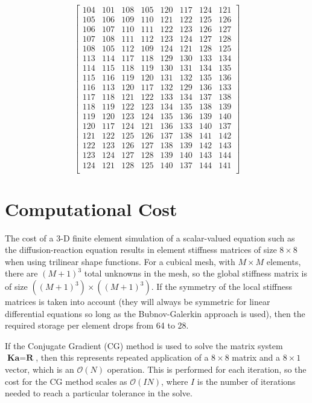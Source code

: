 \documentclass[10pt]{article}
\begin{document}
\begin{equation}
\begin{bmatrix}
104 & 101 & 108 & 105 & 120 & 117 & 124 & 121\\
105 & 106 & 109 & 110 & 121 & 122 & 125 & 126\\
106 & 107 & 110 & 111 & 122 & 123 & 126 & 127\\
107 & 108 & 111 & 112 & 123 & 124 & 127 & 128\\
108 & 105 & 112 & 109 & 124 & 121 & 128 & 125\\
113 & 114 & 117 & 118 & 129 & 130 & 133 & 134\\
114 & 115 & 118 & 119 & 130 & 131 & 134 & 135\\
115 & 116 & 119 & 120 & 131 & 132 & 135 & 136\\
116 & 113 & 120 & 117 & 132 & 129 & 136 & 133\\
117 & 118 & 121 & 122 & 133 & 134 & 137 & 138\\
118 & 119 & 122 & 123 & 134 & 135 & 138 & 139\\
119 & 120 & 123 & 124 & 135 & 136 & 139 & 140\\
120 & 117 & 124 & 121 & 136 & 133 & 140 & 137\\
121 & 122 & 125 & 126 & 137 & 138 & 141 & 142\\
122 & 123 & 126 & 127 & 138 & 139 & 142 & 143\\
123 & 124 & 127 & 128 & 139 & 140 & 143 & 144\\
124 & 121 & 128 & 125 & 140 & 137 & 144 & 141\\
\end{bmatrix}
\end{equation}

\section{Computational Cost}

The cost of a 3-D finite element simulation of a scalar-valued equation such as the diffusion-reaction equation results in element stiffness matrices of size \(8\times8\) when using trilinear shape functions. For a cubical mesh, with \(M\times M\) elements, there are \((M+1)^3\) total unknowns in the mesh, so the global stiffness matrix is of size \(((M+1)^3)\times((M+1)^3)\). If the symmetry of the local stiffness matrices is taken into account (they will always be symmetric for linear differential equations so long as the Bubnov-Galerkin approach is used), then the required storage per element drops from 64 to 28. 

If the Conjugate Gradient (CG) method is used to solve the matrix system \(\textbf{K}\textbf{a}=\textbf{R}\), then this represents repeated application of a \(8\times8\) matrix and a \(8\times1\) vector, which is an \(\mathscr{O}(N)\) operation. This is performed for each iteration, so the cost for the CG method scales as \(\mathscr{O}(IN)\), where \(I\) is the number of iterations needed to reach a particular tolerance in the solve.
\end{document}
